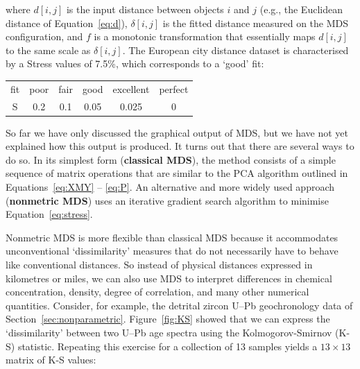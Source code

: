 \noindent where $d[i,j]$ is the input distance between objects $i$ and
$j$ (e.g., the Euclidean distance of Equation~\ref{eq:d}),
$\delta[i,j]$ is the fitted distance measured on the MDS
configuration, and $f$ is a monotonic transformation that essentially
maps $d[i,j]$ to the same scale as $\delta[i,j]$.  The European city
distance dataset is characterised by a Stress values of 7.5\%, which
corresponds to a `good' fit:

\begin{center}
  \begin{tabular}{c|ccccc}
    fit & poor & fair & good & excellent & perfect \\
    S & 0.2 & 0.1 & 0.05 & 0.025 & 0
  \end{tabular}
  \label{tab:S}
\end{center}

So far we have only discussed the graphical output of MDS, but we have
not yet explained how this output is produced. It turns out that there
are several ways to do so. In its simplest form (\textbf{classical
  MDS}), the method consists of a simple sequence of matrix operations
that are similar to the PCA algorithm outlined in
Equations~\ref{eq:XMY} -- \ref{eq:P}. An alternative and more widely
used approach (\textbf{nonmetric MDS}) uses an iterative gradient
search algorithm to minimise Equation~\ref{eq:stress}.\medskip

Nonmetric MDS is more flexible than classical MDS because it
accommodates unconventional `dissimilarity' measures that do not
necessarily have to behave like conventional distances. So instead of
physical distances expressed in kilometres or miles, we can also use
MDS to interpret differences in chemical concentration, density,
degree of correlation, and many other numerical quantities. Consider,
for example, the detrital zircon U--Pb geochronology data of
Section~\ref{sec:nonparametric}. Figure~\ref{fig:KS} showed that we
can express the `dissimilarity' between two U--Pb age spectra using
the Kolmogorov-Smirnov (K-S) statistic. Repeating this exercise for a
collection of 13 samples yields a $13\times{13}$ matrix of K-S values:

